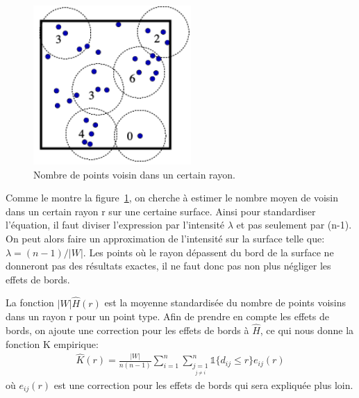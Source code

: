 \documentclass[stage2a]{tnreport}
\begin{document}
\begin{figure}
 \centering
\includegraphics[width=6cm]{figures/nombreVoisins2.png}
\caption{Nombre de points voisin dans un certain rayon.}
\label{fig:nombreVoisins}

\end{figure} 

Comme le montre la figure~\ref{fig:nombreVoisins}, on cherche à estimer le nombre moyen de voisin dans un certain rayon r sur une certaine surface. Ainsi pour standardiser l'équation, il faut diviser l'expression par l'intensité \begin{math}\lambda \end{math} et pas seulement par (n-1). On peut alors faire un approximation de l'intensité sur la surface telle que: \begin{math}\lambda = (n-1)/|W|\end{math}.
Les points où le rayon dépassent du bord de la surface ne donneront pas des résultats exactes, il ne faut donc pas non plus négliger les effets de bords.

La fonction \begin{math}|W|\hat{H}(r)\end{math} est la moyenne standardisée du nombre de points voisins dans un rayon r pour un point type. Afin de prendre en compte les effets de bords, on ajoute une correction pour les effets de bords à \begin{math}\hat{H}\end{math}, ce qui nous donne la fonction K empirique:
\begin{align*}
\hat{K}(r) = \frac{|W|}{n(n-1)} \sum_{i=1}^n \sum_{\underset{j \neq i}{j=1}}^n \mathds{1} \{d_{ij} \leq r \} e_{ij}(r)
\end{align*}
où \begin{math}e_{ij}(r)\end{math} est une correction pour les effets de bords qui sera expliquée plus loin.\\
\end{document}
